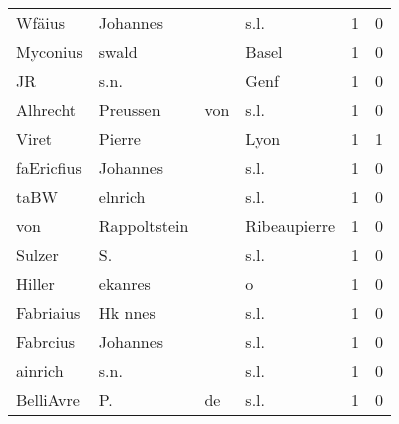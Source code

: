 \begin{center}
\begin{tiny}
\begin{longtabu}{llllrr}
                   Wfäius &                           Johannes &             &                                        s.l. &          1 &         0 \\
                 Myconius &                              swald &             &                                       Basel &          1 &         0 \\
                       JR &                               s.n. &             &                                        Genf &          1 &         0 \\
                 Alhrecht &                           Preussen &         von &                                        s.l. &          1 &         0 \\
                    Viret &                             Pierre &             &                                        Lyon &          1 &         1 \\
               faEricfius &                           Johannes &             &                                        s.l. &          1 &         0 \\
                     taBW &                            elnrich &             &                                        s.l. &          1 &         0 \\
                      von &                       Rappoltstein &             &                                Ribeaupierre &          1 &         0 \\
                   Sulzer &                                 S. &             &                                        s.l. &          1 &         0 \\
                   Hiller &                            ekanres &             &                                           o &          1 &         0 \\
                Fabriaius &                            Hk nnes &             &                                        s.l. &          1 &         0 \\
                 Fabrcius &                           Johannes &             &                                        s.l. &          1 &         0 \\
                  ainrich &                               s.n. &             &                                        s.l. &          1 &         0 \\
                BelliAvre &                                 P. &          de &                                        s.l. &          1 &         0 \\

\end{longtabu}
\end{tiny}
\end{center}
